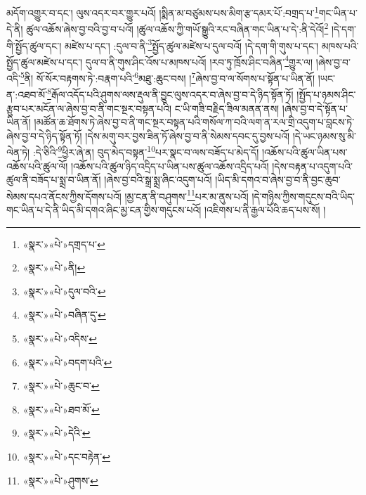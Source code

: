 མདོག་འགྱུར་བ་དང་། ལུས་འདར་བར་གྱུར་པའོ། །སྨིན་མ་བཙུམས་པས་མིག་རྩ་དམར་པོ་:བགྲད་པ་\footnote{«སྣར་»«པེ་»དགྲད་པ་}གང་ཡིན་པ་དེ་ནི། ཚུལ་འཆོས་ཞེས་བྱ་བའི་བྱ་བ་པའོ། །ཚུལ་འཆོས་ཀྱི་གཡོ་སྒྱུའི་རང་བཞིན་གང་ཡིན་པ་དེ་:ནི་དེའོ།\footnote{«སྣར་»«པེ་»ནི།} །དེ་དག་གི་སྤྱོད་ཚུལ་དང་། མཛེས་པ་དང་། :དུལ་བ་ནི་\footnote{«སྣར་»«པེ་»དུལ་བའི་}སྤྱོད་ཚུལ་མཛེས་པ་དུལ་བའོ། །དེ་དག་གི་གུས་པ་དང་། མཁས་པའི་སྤྱོད་ཚུལ་མཛེས་པ་དང་། དུལ་བ་ནི་གུས་ཤིང་འོས་པ་མཁས་པའོ། །རབ་ཏུ་ཁྲོས་ཤིང་བཞིན་\footnote{«སྣར་»«པེ་»བཞིན་དུ་}གྱུར་ལ། །ཞེས་བྱ་བ་འདི་\footnote{«སྣར་»«པེ་»འདིས་}ནི། སོ་སོར་བརྟགས་ཏེ་:བརྣག་པའི་\footnote{«སྣར་»«པེ་»བདག་པའི་}མཐུ་:ཆུང་བས། །\footnote{«སྣར་»«པེ་»ཆུང་བ་}ཞེས་བྱ་བ་ལ་སོགས་པ་སྟོན་པ་ཡིན་ནོ། །ཡང་ན་:འཐབ་མོ་\footnote{«སྣར་»«པེ་»ཐབ་མོ་}རྒོལ་འདོད་པའི་ཤུགས་ལས་རྡུལ་ནི་བྱུང་ལུས་འདར་བ་ཞེས་བྱ་བ་དེ་ཉིད་སྟོན་ཏོ། །སྤྱོད་པ་ཉམས་ཤིང་རྩུབ་པར་མངོན་ལ་ཞེས་བྱ་བ་ནི་གང་སྔར་བསྟན་པའི། ང་ཡི་གཟི་བརྗིད་ཟིལ་མནན་ནས། །ཞེས་བྱ་བ་དེ་སྟོན་པ་ཡིན་ནོ། །མཚོན་ཆ་ཐོགས་ཏེ་ཞེས་བྱ་བ་ནི་གང་སྔར་བསྟན་པའི་གསོལ་ཀ་བའི་ལག་ན་རལ་གྲི་འདུག་པ་བླངས་ཏེ་ཞེས་བྱ་བ་དེ་ཉིད་སྟོན་ཏོ། །དེས་མགུ་བར་བྱས་ཟིན་ཏོ་ཞེས་བྱ་བ་ནི་སེམས་དབང་དུ་བྱས་པའོ། །དེ་ཡང་ཉམས་སུ་མི་ལེན་ཏེ། :དེ་ཅིའི་\footnote{«སྣར་»«པེ་»དེའི་}ཕྱིར་ཞེ་ན། བུད་མེད་བསྟན་\footnote{«སྣར་»«པེ་»དང་བརྟེན་}པར་སྣང་བ་ལས་བཟོད་པ་མེད་དོ། །འཆོས་པའི་ཚུལ་ཡིན་པས་འཆོས་པའི་ཚུལ་ལོ། །འཆོས་པའི་ཚུལ་ཉིད་འདྲིད་པ་ཡིན་པས་ཚུལ་འཆོས་འདྲིད་པའོ། །དེས་བརྟན་པ་འདུག་པའི་ཚུལ་ནི་བཟོད་པ་སྨྲ་བ་ཡིན་ནོ། །ཞེས་བྱ་བའི་སྒྲ་སྨྲ་ཞིང་འདུག་པའོ། །ཡིད་མི་དགའ་བ་ཞེས་བྱ་བ་ནི་བྱང་ཆུབ་སེམས་དཔའ་ནོངས་ཀྱིས་དོགས་པའོ། །མྱ་ངན་ནི་བཤུགས་\footnote{«སྣར་»«པེ་»ཤུགས་}པར་མ་ནུས་པའོ། །དེ་གཉིས་ཀྱིས་གདུངས་བའི་ཡིད་གང་ཡིན་པ་དེ་ནི་ཡིད་མི་དགའ་ཞིང་མྱ་ངན་གྱིས་གདུངས་པའོ། །འཇིགས་པ་ནི་རྒྱལ་པོའི་ཆད་པས་སོ། །
